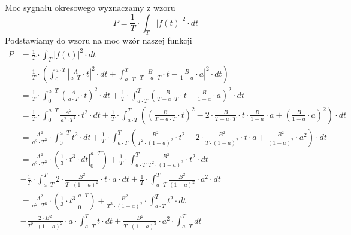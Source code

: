 \begin{task}
Moc sygnału okresowego wyznaczamy z wzoru
\begin{equation}
P=\frac{1}{T} \cdot \int_{T}^{}\left|f(t)\right|^2 \cdot dt
\end{equation}
Podstawiamy do wzoru na moc wzór naszej funkcji
\begin{align*}
P&=\frac{1}{T} \cdot \int_{T}^{}\left|f(t)\right|^2 \cdot dt\\
 &=\frac{1}{T} \cdot \left( \int_{0}^{a \cdot T}\left|\frac{A}{a \cdot T}\cdot t \right|^2 \cdot dt
  +\int_{a \cdot T}^{T}\left|\frac{B}{T - a \cdot T}\cdot t - \frac{B}{1 - a} \cdot a\right|^2 \cdot dt \right)\\ 
 &=\frac{1}{T} \cdot \int_{0}^{a \cdot T}\left(\frac{A}{a \cdot T}\cdot t \right)^2 \cdot dt
  +\frac{1}{T} \cdot \int_{a \cdot T}^{T}\left(\frac{B}{T - a \cdot T}\cdot t - \frac{B}{1 - a} \cdot a\right)^2 \cdot dt\\ 
 &=\frac{1}{T} \cdot \int_{0}^{a \cdot T}\frac{A^2}{a^2 \cdot T^2}\cdot t^2 \cdot dt
 +\frac{1}{T} \cdot \int_{a \cdot T}^{T}\left(\left(\frac{B}{T - a \cdot T}\cdot t\right)^2 - 2\cdot \frac{B}{T - a \cdot T}\cdot t \cdot  \frac{B}{1 - a} \cdot a + \left( \frac{B}{1 - a} \cdot a\right)^2 \right) \cdot dt\\
 &=\frac{A^2}{a^2 \cdot T^3}\cdot \int_{0}^{a \cdot T} t^2 \cdot dt
 +\frac{1}{T} \cdot \int_{a \cdot T}^{T}\left(\frac{B^2}{T^2 \cdot \left(1 - a \right)^2}\cdot t^2 - 2\cdot \frac{B^2}{T\cdot \left(1 - a\right)^2}\cdot t \cdot a + \frac{B^2}{\left(1 - a \right)^2} \cdot a^2 \right) \cdot dt\\
 &=\frac{A^2}{a^2 \cdot T^3}\cdot \left(\left. \frac{1}{3}\cdot t^3 \cdot dt \right|_{0}^{a \cdot T} \right)
 +\frac{1}{T} \cdot \int_{a \cdot T}^{T} \frac{B^2}{T^2 \cdot \left(1 - a \right)^2}\cdot t^2 \cdot dt \\
 &- \frac{1}{T} \cdot \int_{a \cdot T}^{T} 2\cdot \frac{B^2}{T\cdot \left(1 - a\right)^2}\cdot t \cdot a \cdot dt + \frac{1}{T} \cdot \int_{a \cdot T}^{T} \frac{B^2}{\left(1 - a \right)^2} \cdot a^2 \cdot dt\\ 
 &=\frac{A^2}{a^2 \cdot T^3}\cdot \left(\left. \frac{1}{3}\cdot t^3 \right|_{0}^{a \cdot T} \right)
 +\frac{B^2}{T^3 \cdot \left(1 - a \right)^2}\cdot \int_{a \cdot T}^{T}  t^2 \cdot dt \\
 &- \frac{2\cdot B^2}{T^2 \cdot \left(1 - a\right)^2}\cdot a \cdot \int_{a \cdot T}^{T} t \cdot dt 
 + \frac{B^2}{T \cdot \left(1 - a \right)^2} \cdot a^2 \cdot \int_{a \cdot T}^{T} dt\\

\end{align*}
\end{task}

